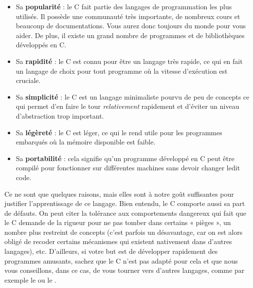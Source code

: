 \begin{itemize}
\item Sa \textbf{popularité} : le C fait partie des langages de
  programmation les plus utilisés. Il possède une communauté très
  importante, de nombreux cours et beaucoup de documentations. Vous
  aurez donc toujours du monde pour vous aider. De plus, il existe un
  grand nombre de programmes et de bibliothèques développés en C.
\item Sa \textbf{rapidité} : le C est connu pour être un langage très
  rapide, ce qui en fait un langage de choix pour tout programme où la
  vitesse d'exécution est cruciale.
\item Sa \textbf{simplicité} : le C est un langage minimaliste pourvu
  de peu de concepts ce qui permet d'en faire le tour
  \emph{relativement} rapidement et d'éviter un niveau d'abstraction
  trop important.
\item Sa \textbf{légèreté} : le C est léger, ce qui le rend utile pour
  les programmes embarqués où la mémoire disponible est faible.
\item Sa \textbf{portabilité} : cela signifie qu'un programme
  développé en C peut être compilé pour fonctionner sur différentes
  machines sans devoir changer ledit code.
\end{itemize}

Ce ne sont que quelques raisons, mais elles sont à notre goût
suffisantes pour justifier l'apprentissage de ce langage. Bien
entendu, le C comporte aussi sa part de défauts. On peut citer la
tolérance aux comportements dangereux qui fait que le C demande de la
rigueur pour ne pas tomber dans certains « pièges », un nombre plus
restreint de concepts (c'est parfois un désavantage, car on est alors
obligé de recoder certains mécanismes qui existent nativement dans
d'autres langages), etc. D'ailleurs, si votre but est de développer
rapidement des programmes amusants, sachez que le C n'est pas adapté
pour cela et que nous vous conseillons, dans ce cas, de vous tourner
vers d'autres langages, comme par exemple le
ou le
.

